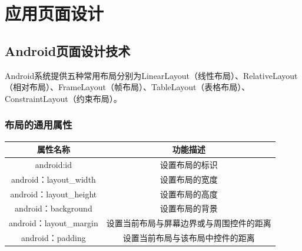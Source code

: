 \documentclass[UTF8,12pt]{article}
\newcommand\myemptypage{
    \null
    \thispagestyle{empty}
    \addtocounter{page}{-1}
    \newpage
}
\begin{document}
\begin{titlepage}
    
\end{titlepage}

\myemptypage

\begin{center}
    \tableofcontents
\end{center}
\newpage

\section{应用页面设计}
\subsection{Android页面设计技术}
Android系统提供五种常用布局分别为LinearLayout（线性布局）、RelativeLayout（相对布局）、FrameLayout（帧布局）、TableLayout（表格布局）、ConstraintLayout（约束布局）。

\subsubsection{布局的通用属性}
\begin{table}[htbp]
    \centering
    \begin{tabular}{cc}
    \hline
    属性名称                   & 功能描述                 \\ \hline
    android:id             & 设置布局的标识              \\
    android：layout\_width  & 设置布局的宽度              \\
    android：layout\_height & 设置布局的高度              \\
    android：background     & 设置布局的背景              \\
    android：layout\_margin & 设置当前布局与屏幕边界或与周围控件的距离 \\
    android：padding        & 设置当前布局与该布局中控件的距离     \\ \hline
    \end{tabular}
\end{table}
\end{document}
